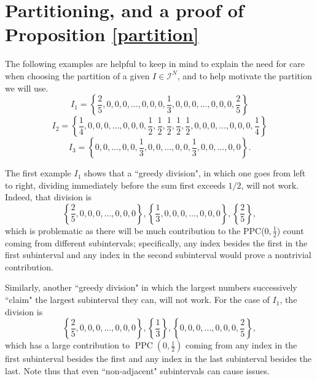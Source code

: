 \documentclass[12pt]{amsart}
\theoremstyle{definition}
\newcommand{\vs}{\vspace{3mm}}
\newcommand{\mc}{\mathcal}
\DeclareMathOperator{\PPC}{PPC}
\DeclareMathOperator{\summ}{sum}
\begin{document}

\vspace{1.5mm}

\section{Partitioning, and a proof of Proposition \ref{partition}}\label{partitionsection}

{\normalfont 

\vspace{1.5mm}

The following examples are helpful to keep in mind to explain the need for care when choosing the partition of a given $I \in \mc{I}^N$, and to help motivate the partition we will use. \vspace{1.5mm} $${\textstyle I_1 = \left\{\frac{2}{5},0,0,0,\dots,0,0,0,\frac{1}{3},0,0,0,\dots,0,0,0,\frac{2}{5}\right\}}$$ \vspace{1.5mm} $${\textstyle I_2 = \left\{\frac{1}{4},0,0,0,\dots,0,0,0,\frac{1}{2},\frac{1}{2},\frac{1}{2},\frac{1}{2},\frac{1}{2},0,0,0,\dots,0,0,0,\frac{1}{4}\right\}}$$ \vspace{1.5mm} $${\textstyle I_3 = \left\{0,0,\dots,0,0,\frac{1}{3},0,0,\dots,0,0,\frac{1}{3},0,0,\dots,0,0\right\}.}$$ 

\vs

The first example $I_1$ shows that a ``greedy division", in which one goes from left to right, dividing immediately before the sum first exceeds $1/2$, will not work. Indeed, that division is $${\textstyle \left\{\frac{2}{5},0,0,0,\dots,0,0,0\right\},\left\{\frac{1}{3},0,0,0,\dots,0,0,0\right\},\left\{\frac{2}{5}\right\}},$$ which is problematic as there will be much contribution to the PPC($0,\frac{1}{2}$) count coming from different subintervals; specifically, any index besides the first in the first subinterval and any index in the second subinterval would prove a nontrivial contribution. 

\vspace{1mm}

Similarly, another ``greedy division" in which the largest numbers successively ``claim" the largest subinterval they can, will not work. For the case of $I_1$, the division is $${\textstyle \left\{\frac{2}{5},0,0,0,\dots,0,0,0\right\},\left\{\frac{1}{3}\right\},\left\{0,0,0,\dots,0,0,0,\frac{2}{5}\right\},}$$ which has a large contribution to $\PPC(0,\frac{1}{2})$ coming from any index in the first subinterval besides the first and any index in the last subinterval besides the last. Note thus that even ``non-adjacent" subintervals can cause issues.

}
\end{document}
